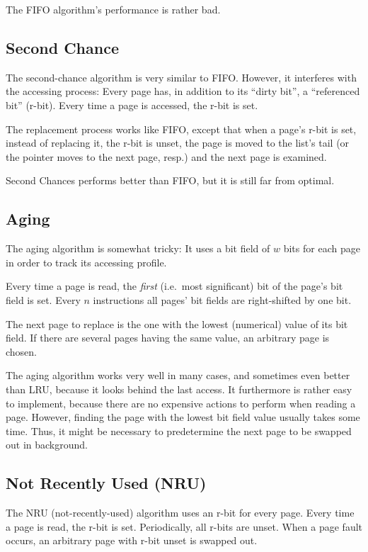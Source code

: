\documentclass[a4paper,12pt,BCOR2cm,DIV12]{scrartcl}
\begin{document}
The FIFO algorithm's performance is rather bad.

\subsection{Second Chance}

The second-chance algorithm is very similar to FIFO.  However, it
interferes with the accessing process: Every page has, in addition to
its ``dirty bit'', a ``referenced bit'' (r-bit).  Every time a page is
accessed, the r-bit is set.

The replacement process works like FIFO, except that when a page's
r-bit is set, instead of replacing it, the r-bit is unset, the page is
moved to the list's tail (or the pointer moves to the next page,
resp.) and the next page is examined.

Second Chances performs better than FIFO, but it is still far from
optimal.

\subsection{Aging}

The aging algorithm is somewhat tricky: It uses a bit field of $w$
bits for each page in order to track its accessing profile.

Every time a page is read, the \emph{first} (i.e.\ most significant)
bit of the page's bit field is set.  Every $n$ instructions all pages'
bit fields are right-shifted by one bit.

The next page to replace is the one with the lowest (numerical) value
of its bit field.  If there are several pages having the same value,
an arbitrary page is chosen.

The aging algorithm works very well in many cases, and sometimes even
better than LRU, because it looks behind the last access.  It
furthermore is rather easy to implement, because there are no
expensive actions to perform when reading a page.  However, finding
the page with the lowest bit field value usually takes some time.
Thus, it might be necessary to predetermine the next page to be
swapped out in background.

\subsection{Not Recently Used (NRU)}

The NRU (not-recently-used) algorithm uses an r-bit for every page.
Every time a page is read, the r-bit is set.  Periodically, all r-bits
are unset.  When a page fault occurs, an arbitrary page with r-bit
unset is swapped out.
\end{document}
